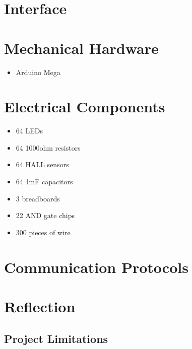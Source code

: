 \documentclass[12pt, titlepage]{article}
\begin{document}

% 

\newpage{}

\appendix

\section{Interface}


\section{Mechanical Hardware}
\begin{itemize}
  \item Arduino Mega
\end{itemize}

\section{Electrical Components}
\begin{itemize}
  \item 64 LEDs
  \item 64 1000ohm resistors
  \item 64 HALL sensors
  \item 64 1mF capacitors
  \item 3 breadboards
  \item 22 AND gate chips
  \item 300 pieces of wire
\end{itemize}

\section{Communication Protocols}

\section{Reflection}

\subsection*{Project Limitations}
\end{document}
